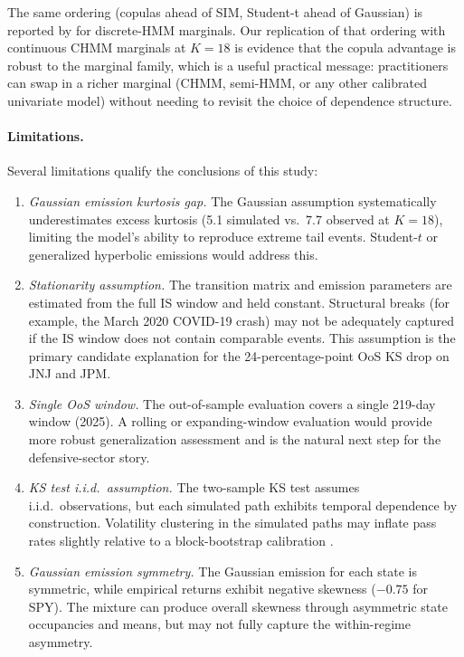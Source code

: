 The same ordering (copulas ahead of SIM, Student-t ahead of Gaussian) is reported by \citet{alswaidan2026hybrid} for discrete-HMM marginals.
Our replication of that ordering with continuous CHMM marginals at $K = 18$ is evidence that the copula advantage is robust to the marginal family, which is a useful practical message: practitioners can swap in a richer marginal (CHMM, semi-HMM, or any other calibrated univariate model) without needing to revisit the choice of dependence structure.

\paragraph{Limitations.}
Several limitations qualify the conclusions of this study:
\begin{enumerate}
    \item \textit{Gaussian emission kurtosis gap.}
    The Gaussian assumption systematically underestimates excess kurtosis (5.1 simulated vs.\ 7.7 observed at $K = 18$), limiting the model's ability to reproduce extreme tail events.
    Student-$t$ or generalized hyperbolic emissions would address this.

    \item \textit{Stationarity assumption.}
    The transition matrix and emission parameters are estimated from the full IS window and held constant.
    Structural breaks (for example, the March 2020 COVID-19 crash) may not be adequately captured if the IS window does not contain comparable events.
    This assumption is the primary candidate explanation for the 24-percentage-point OoS KS drop on JNJ and JPM.

    \item \textit{Single OoS window.}
    The out-of-sample evaluation covers a single 219-day window (2025).
    A rolling or expanding-window evaluation would provide more robust generalization assessment and is the natural next step for the defensive-sector story.

    \item \textit{KS test i.i.d.\ assumption.}
    The two-sample KS test assumes i.i.d.\ observations, but each simulated path exhibits temporal dependence by construction.
    Volatility clustering in the simulated paths may inflate pass rates slightly relative to a block-bootstrap calibration \cite{alswaidan2026hybrid}.

    \item \textit{Gaussian emission symmetry.}
    The Gaussian emission for each state is symmetric, while empirical returns exhibit negative skewness ($-0.75$ for SPY).
    The mixture can produce overall skewness through asymmetric state occupancies and means, but may not fully capture the within-regime asymmetry.


\end{enumerate}
